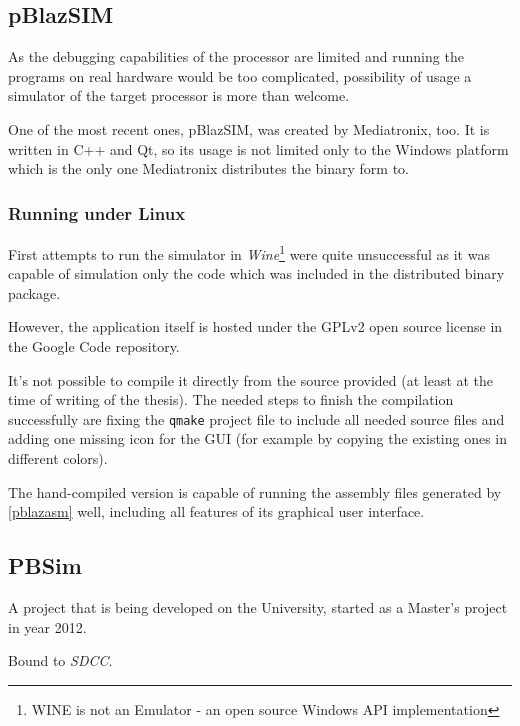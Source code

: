         \subsection{pBlazSIM}\label{pblazsim}

        As the debugging capabilities of the processor are limited and running the programs on real hardware would be too complicated, possibility of usage a simulator of the target processor is more than welcome.

        One of the most recent ones, pBlazSIM, was created by Mediatronix, too. It is written in C++ and Qt, so its usage is not limited only to the Windows platform which is the only one Mediatronix distributes the binary form to.

            \subsubsection{Running under Linux}

            First attempts to run the simulator in \emph{Wine}\footnote{WINE is not an Emulator - an open source Windows API implementation} were quite unsuccessful as it was capable of simulation only the code which was included in the distributed binary package.

            However, the application itself is hosted under the GPLv2 open source license in the Google Code repository. 

            It's not possible to compile it directly from the source provided (at least at the time of writing of the thesis). The needed steps to finish the compilation successfully are fixing the \texttt{qmake} project file to include all needed source files and adding one missing icon for the GUI (for example by copying the existing ones in different colors).

            The hand-compiled version is capable of running the assembly files generated by \ref{pblazasm} well, including all features of its graphical user interface.

        \subsection{PBSim}\label{pbsim}

        A project that is being developed on the University, started as a Master's project in year 2012.

        Bound to \emph{SDCC}.

